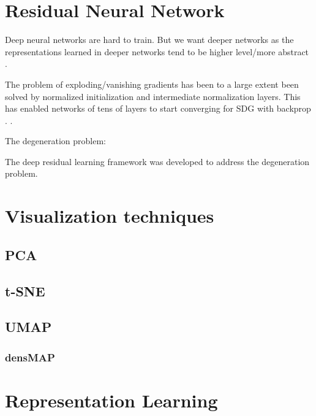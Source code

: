 \documentclass[../../thesis.tex]{subfiles}
\begin{document}
\section{Residual Neural Network}

Deep neural networks are hard to train. But we want deeper networks as the representations learned in deeper networks tend to be higher level/more abstract \cite{zeiler2013visualizing}. 

The problem of exploding/vanishing gradients  has been to a large extent been solved by normalized initialization and intermediate normalization layers. This has enabled networks of tens of layers to start converging for SDG with backprop \cite{he2015deep}. .



The degeneration problem: 

The deep residual learning framework was developed to address the degeneration problem.

\cite{he2015deep}



\section{Visualization techniques}

\subsection{PCA}

\subsection{t-SNE}

\subsection{UMAP}
\subsubsection{densMAP}



\section{Representation Learning}

\end{document}
